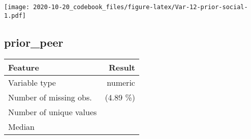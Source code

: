 \documentclass[]{article}
\begin{document}
\begin{minipage}{0.25 \textwidth}

\texttt{[image: 2020-10-20\_codebook\_files/figure-latex/Var-12-prior-social-1.pdf]}

\end{minipage}

\noindent\makebox[\linewidth]{\rule{\textwidth}{0.4pt}}

\hypertarget{prior_peer}{%
\subsection{prior\_peer}\label{prior_peer}}

\begin{minipage}{0.75 \textwidth}

\begin{longtable}[]{@{}lr@{}}
\toprule
\begin{minipage}[b]{0.34\columnwidth}\raggedright
Feature\strut
\end{minipage} & \begin{minipage}[b]{0.20\columnwidth}\raggedleft
Result\strut
\end{minipage}\tabularnewline
\midrule
\endhead
\begin{minipage}[t]{0.34\columnwidth}\raggedright
Variable type\strut
\end{minipage} & \begin{minipage}[t]{0.20\columnwidth}\raggedleft
numeric\strut
\end{minipage}\tabularnewline
\begin{minipage}[t]{0.34\columnwidth}\raggedright
Number of missing obs.\strut
\end{minipage} & \begin{minipage}[t]{0.20\columnwidth}\raggedleft
266 (4.89 \%)\strut
\end{minipage}\tabularnewline
\begin{minipage}[t]{0.34\columnwidth}\raggedright
Number of unique values\strut
\end{minipage} & \begin{minipage}[t]{0.20\columnwidth}\raggedleft
10\strut
\end{minipage}\tabularnewline
\begin{minipage}[t]{0.34\columnwidth}\raggedright
Median\strut
\end{minipage} & \begin{minipage}[t]{0.20\columnwidth}\raggedleft
1\strut
\end{minipage}\tabularnewline

\end{longtable}
\end{minipage}
\end{document}
